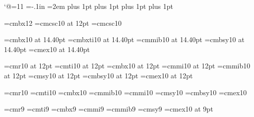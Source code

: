%
%






\catcode`@=11
\hsize=38pc
\vsize=54pc
\voffset=-.1in
\topskip=12pt
\parindent=2em
\parskip=0pt
\hfuzz=10pt
\abovedisplayskip=6pt plus 1pt
\abovedisplayshortskip=6pt plus 1pt
\belowdisplayskip=6pt plus 1pt
\belowdisplayshortskip=6pt plus 1pt
\frenchspacing





\font\authorfont=cmbx12
\font\smc=cmcsc10 at 12pt
\font\smcnine=cmcsc10


\font\fourteenrm=cmbx10 at 14.40pt
\font\fourteenit=cmbxti10 at 14.40pt
\font\fourteeni=cmmib10 at 14.40pt
\font\fourteensy=cmbsy10 at 14.40pt
\font\fourteenex=cmex10 at 14.40pt

\font\twelverm=cmr10 at 12pt
\font\twelveit=cmti10 at 12pt
\font\twelvebf=cmbx10 at 12pt
\font\twelvei=cmmi10 at 12pt
\font\twelveib=cmmib10 at 12pt
\font\twelvesy=cmsy10 at 12pt
\font\twelvebsy=cmbsy10 at 12pt
\font\twelveex=cmex10 at 12pt

\font\tenrm=cmr10
\font\tenit=cmti10
\font\tenbf=cmbx10
\font\tenib=cmmib10 %
\font\teni=cmmi10
\font\tensy=cmsy10
\font\tenbsy=cmbsy10
\font\tenex=cmex10

\font\ninerm=cmr9
\font\nineit=cmti9
\font\ninebf=cmbx9
\font\ninei=cmmi9
\font\nineib=cmmib9  %
\font\ninesy=cmsy9
\font\nineex=cmex10 at 9pt

